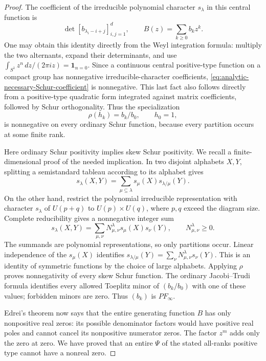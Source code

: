\begin{proof}
The coefficient of the irreducible polynomial character
$s_\lambda$ in this central function is
\begin{equation}\label{eq:analytic-necessary-Schur-coefficient}
                      \det[b_{\lambda_i-i+j}]_{i,j=1}^d,
                       \qquad B(z)=\sum_{k\ge0}b_kz^k.
\end{equation}
One may obtain this identity directly from the Weyl integration
formula: multiply the two alternants, expand their determinants,
and use
$\int_{S^1}z^n\,dz/(2\pi iz)=\mathbf1_{n=0}$.
Since a continuous central positive-type function on a compact
group has nonnegative irreducible-character coefficients,
\eqref{eq:analytic-necessary-Schur-coefficient} is nonnegative.
This last fact also follows directly from a positive-type
quadratic form integrated against matrix coefficients, followed
by Schur orthogonality. Thus the specialization
\[
             \rho(h_k)=b_k/b_0,\qquad h_0=1,
\]
is nonnegative on every ordinary Schur function, because every
partition occurs at some finite rank.

Here ordinary Schur positivity implies skew Schur positivity.
We recall a finite-dimensional proof of the needed implication.
In two disjoint alphabets $X,Y$, splitting a semistandard
tableau according to its alphabet gives
\[
        s_\lambda(X,Y)=
             \sum_{\mu\subseteq\lambda}s_\mu(X)s_{\lambda/\mu}(Y).
\]
On the other hand, restrict the polynomial irreducible
representation with character $s_\lambda$ of $U(p+q)$ to
$U(p)\times U(q)$, where $p,q$ exceed the diagram size.
Complete reducibility gives a nonnegative integer sum
\[
        s_\lambda(X,Y)=
             \sum_{\mu,\nu}N_{\mu,\nu}^\lambda
                           s_\mu(X)s_\nu(Y),
                         \qquad N_{\mu,\nu}^\lambda\ge0.
\]
The summands are polynomial representations, so only partitions
occur. Linear independence of the $s_\mu(X)$ identifies
$s_{\lambda/\mu}(Y)=\sum_\nu N_{\mu,\nu}^\lambda s_\nu(Y)$.
This is an identity of symmetric functions by the choice of
large alphabets. Applying $\rho$ proves nonnegativity of every
skew Schur function. The ordinary Jacobi--Trudi formula
identifies every allowed Toeplitz minor of $(b_k/b_0)$ with
one of these values; forbidden minors are zero. Thus $(b_k)$
is $PF_\infty$.

Edrei's theorem now says that the entire generating function
$B$ has only nonpositive real zeros: its possible denominator
factors would have positive real poles and cannot cancel its
nonpositive numerator zeros. The factor $z^m$ adds only the
zero at zero. We have proved that an entire $\Psi$ of the stated
all-ranks positive type cannot have a nonreal zero.


\end{proof}
